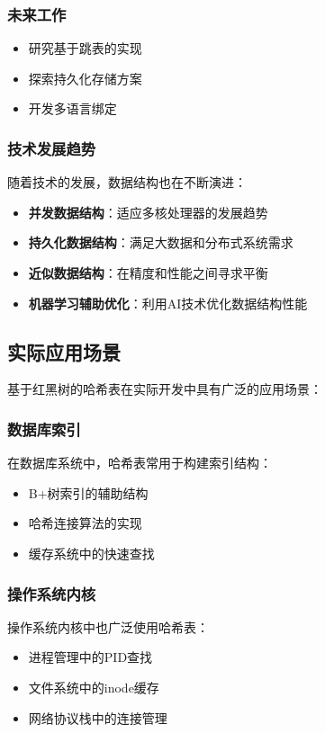 \documentclass[12pt,a4paper]{article}
\begin{document}
\subsubsection{未来工作}
\begin{itemize}
\item 研究基于跳表的实现
\item 探索持久化存储方案
\item 开发多语言绑定
\end{itemize}

\subsubsection{技术发展趋势}
随着技术的发展，数据结构也在不断演进：
\begin{itemize}
\item \textbf{并发数据结构}：适应多核处理器的发展趋势
\item \textbf{持久化数据结构}：满足大数据和分布式系统需求
\item \textbf{近似数据结构}：在精度和性能之间寻求平衡
\item \textbf{机器学习辅助优化}：利用AI技术优化数据结构性能
\end{itemize}

\subsection{实际应用场景}
基于红黑树的哈希表在实际开发中具有广泛的应用场景：

\subsubsection{数据库索引}
在数据库系统中，哈希表常用于构建索引结构：
\begin{itemize}
\item B+树索引的辅助结构
\item 哈希连接算法的实现
\item 缓存系统中的快速查找
\end{itemize}

\subsubsection{操作系统内核}
操作系统内核中也广泛使用哈希表：
\begin{itemize}
\item 进程管理中的PID查找
\item 文件系统中的inode缓存
\item 网络协议栈中的连接管理
\end{itemize}
\end{document}
